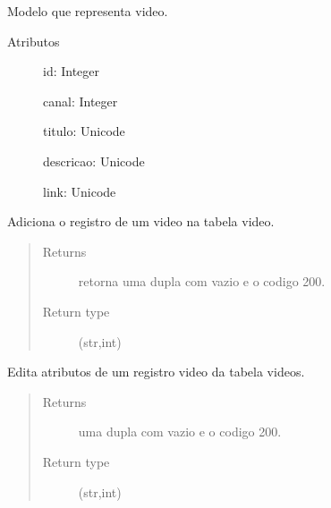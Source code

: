 \documentclass[letterpaper,10pt,english]{sphinxmanual}
\begin{document}
\label{\detokenize{index:module-video}}

\begin{fulllineitems}
\label{\detokenize{index:video.Video}}
Modelo que representa video.
\begin{description}
\item[{Atributos}] \leavevmode
id: Integer

canal: Integer

titulo: Unicode

descricao: Unicode

link: Unicode

\end{description}

\end{fulllineitems}


\begin{fulllineitems}
\label{\detokenize{index:video.add_video}}
Adiciona o registro de um video na tabela
video.
\begin{quote}\begin{description}
\item[{Returns}] \leavevmode
retorna uma dupla com vazio e o codigo 200.

\item[{Return type}] \leavevmode
(str,int)

\end{description}\end{quote}

\end{fulllineitems}


\begin{fulllineitems}
\label{\detokenize{index:video.edit_video}}
Edita atributos de um registro video
da tabela videos.
\begin{quote}\begin{description}
\item[{Returns}] \leavevmode
uma dupla com vazio e o codigo 200.

\item[{Return type}] \leavevmode
(str,int)

\end{description}\end{quote}

\end{fulllineitems}
\end{document}
